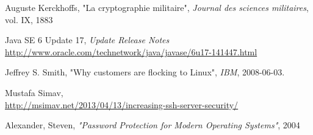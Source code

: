 \documentclass[11pt]{report}
\begin{document}
\begin{thebibliography}{9}

  Auguste Kerckhoffs,
  "La cryptographie militaire",
  \emph{Journal des sciences militaires},
  vol. IX,
  1883

  Java SE 6 Update 17, \emph{Update Release Notes} \\
  \url{http://www.oracle.com/technetwork/java/javase/6u17-141447.html}

  Jeffrey S. Smith,
  "Why customers are flocking to Linux",
  \emph{IBM},
  2008-06-03.

  Mustafa Simav, \\
  \url{http://msimav.net/2013/04/13/increasing-ssh-server-security/}

  Alexander, Steven, 
  \emph{"Password Protection for Modern Operating Systems"},
  2004

\end{thebibliography}
\end{document}
